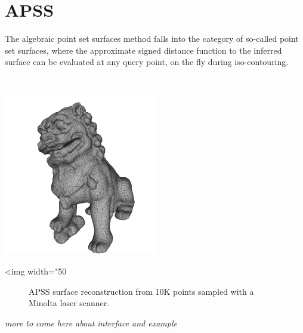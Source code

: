 \section{APSS}

The algebraic point set surfaces method falls \cite{Guennebaud07}  into the category of so-called point set surfaces, where the approximate signed distance function to the inferred surface can be evaluated at any query point, on the fly during iso-contouring.

  \\

\begin{center}
    \label{Surface_reconstruction_points_3-fig-APSS}
    \begin{ccTexOnly}
        \includegraphics[width=0.5\textwidth]{Surface_reconstruction_points_3/APSS} %
    \end{ccTexOnly}
    \begin{ccHtmlOnly}
        <img width="50%
    \end{ccHtmlOnly}
    \begin{figure}[h]
        \caption{APSS surface reconstruction from 10K
                 points sampled with a Minolta laser scanner.}
    \end{figure}
\end{center}


\emph{more to come here about interface and example}


